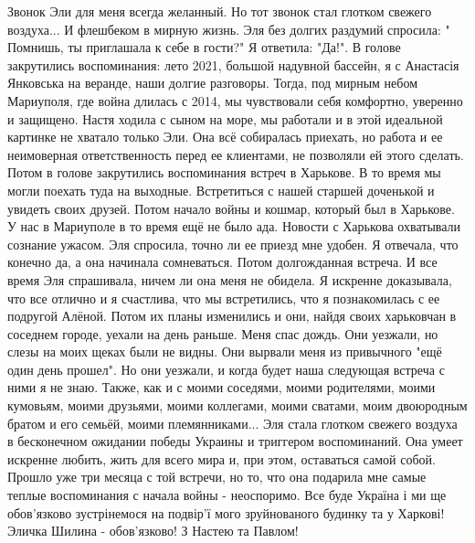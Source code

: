 Звонок Эли для меня всегда желанный. Но тот звонок стал глотком свежего
воздуха... И флешбеком в мирную жизнь. Эля без долгих раздумий спросила: "
Помнишь, ты приглашала к себе в гости?" Я ответила: "Да!". В голове закрутились
воспоминания: лето 2021, большой надувной бассейн, я с Анастасія Янковська на
веранде, наши долгие разговоры. Тогда, под мирным небом Мариуполя, где война
длилась с 2014, мы чувствовали себя комфортно, уверенно и защищено. Настя
ходила с сыном на море, мы работали и в этой идеальной картинке не хватало
только Эли. Она всё собиралась приехать, но работа и ее неимоверная
ответственность перед ее клиентами, не позволяли ей этого сделать. Потом в
голове закрутились воспоминания встреч в Харькове. В то время мы могли поехать
туда на выходные. Встретиться с нашей старшей доченькой и увидеть своих друзей.
Потом начало войны и кошмар, который был в Харькове. У нас в Мариуполе в то
время ещё не было ада. Новости с Харькова охватывали сознание ужасом. Эля
спросила, точно ли ее приезд мне удобен. Я отвечала, что конечно да, а она
начинала сомневаться. Потом долгожданная встреча. И все время Эля спрашивала,
ничем ли она меня не обидела. Я искренне доказывала, что все отлично и я
счастлива, что мы встретились, что я познакомилась с ее подругой Алёной. Потом
их планы изменились и они, найдя своих харьковчан в соседнем городе, уехали на
день раньше. Меня спас дождь. Они уезжали, но слезы на моих щеках были не
видны. Они вырвали меня из привычного "ещё один день прошел". Но они уезжали, и
когда будет наша следующая встреча с ними я не знаю. Также, как и с моими
соседями, моими родителями, моими кумовьям, моими друзьями, моими коллегами,
моими сватами, моим двоюродным братом и его семьёй, моими племянниками... Эля
стала глотком свежего воздуха в бесконечном ожидании победы Украины и триггером
воспоминаний. Она умеет искренне любить, жить для всего мира и, при этом,
оставаться самой собой. Прошло уже три месяца с той встречи, но то, что она
подарила мне самые теплые воспоминания с начала войны - неоспоримо. Все буде
Україна і ми ще обов'язково зустрінемося на подвір'ї мого зруйнованого будинку
та у Харкові! Эличка Шилина - обов'язково! З Настею та Павлом!

